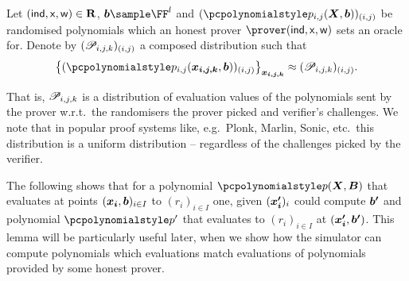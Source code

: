 \documentclass[runningheads,11pt]{llncs}
\let\spvec\vec
\let\vec\accentvec
\let\spvec\vec
\let\vec\spvec
\def\vec#1{\mathchoice{\mbox{\boldmath$\displaystyle#1$}}
  {\mbox{\boldmath$\textstyle#1$}} {\mbox{\boldmath$\scriptstyle#1$}}
  {\mbox{\boldmath$\scriptscriptstyle#1$}}}
\begin{document}
Let $({\mathsf{ind}}, \mathsf{x}, \mathsf{w}) \in \mathbf{R}$, $\vec{b} \sample \FF^{l}$ and
$(\p{p}_{i, j} (\vec{X}, \vec{b}))_{(i, j)}$ be randomised polynomials which an honest
prover $\prover (\ind, \inp, \wit)$ sets an oracle for. Denote by $(\mathscr{P}_{i, j,
  k})_{(i, j)}$ a composed distribution such that
\begin{equation}
  \left\{ (\p{p}_{i, j} (\vec{x_{i, j, k}}, \vec{b}))_{(i, j)}\right\}_{\vec{x_{i, j,
        k}}} \approx (\dist{P}_{i, j, k})_{(i, j)}.\label{eq:distribution_P}
\end{equation}

That is, $\mathscr{P}_{i, j, k}$ is a distribution of evaluation values of the
polynomials sent by the prover w.r.t.~the randomisers the prover picked and
verifier's challenges. We note that in popular proof systems like, e.g.~Plonk,
Marlin, Sonic, etc.~this distribution is a uniform distribution -- regardless of the
challenges picked by the verifier.

The following shows that for a polynomial $\p{p} (\vec{X}, \vec{B})$ that evaluates at
points $(\vec{x_i}, \vec{b})_{i \in I}$ to $(r_i)_{i \in I}$ one, given $(\vec{x'_i})_i$
could compute $\vec{b'}$ and polynomial $\p{p'}$ that evaluates to $(r_i)_{i \in I}$ at
$(\vec{x'_i}, \vec{b'})$. This lemma will be particularly useful later, when we show how
the simulator can compute polynomials which evaluations match evaluations of polynomials
provided by some honest prover.
\end{document}
